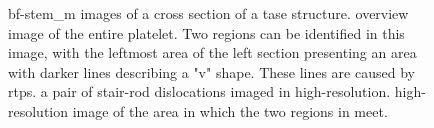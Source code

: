 \begin{figure}
{{        }
    }
    \caption{\acs{bf}-\acs{stem_m} images of a cross section of a \acs{tase} structure.  overview image of the entire platelet. Two regions can be identified in this image, with the leftmost area of the left section presenting an area with darker lines describing a "v" shape. These lines are caused by \acs{rtp}s.  a pair of stair-rod dislocations \cite{Bologna2018} imaged in high-resolution.  high-resolution image of the area in which the two regions in  meet.}
    \label{fig:2020_Merge}
\end{figure}

